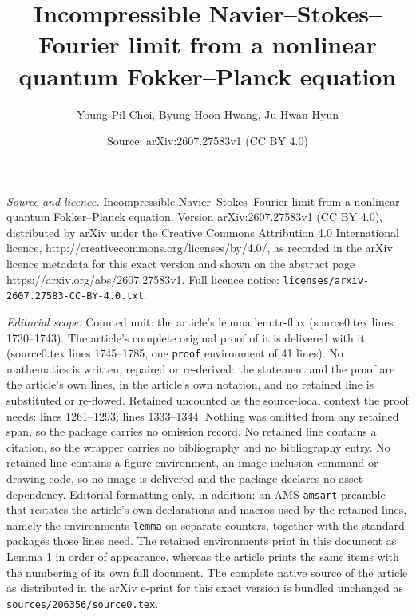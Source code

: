 \documentclass[10pt,a4paper]{amsart}
\title{Incompressible Navier--Stokes--Fourier limit from a nonlinear quantum Fokker--Planck equation}
\author{Young-Pil Choi, Byung-Hoon Hwang, Ju-Hwan Hyun}
\date{Source: arXiv:2607.27583v1 (CC BY 4.0)}
\begin{document}
\maketitle

\noindent\emph{Source and licence.} Incompressible Navier--Stokes--Fourier limit from a nonlinear quantum Fokker--Planck equation. Version arXiv:2607.27583v1 (CC BY 4.0), distributed by arXiv under the Creative Commons Attribution 4.0 International licence, http://creativecommons.org/licenses/by/4.0/, as recorded in the arXiv licence metadata for this exact version and shown on the abstract page https://arxiv.org/abs/2607.27583v1. Full licence notice: \texttt{licenses/arxiv-2607.27583-CC-BY-4.0.txt}.\par\smallskip

\noindent\textit{Editorial scope.} Counted unit: the article's lemma lem:tr-flux (source0.tex lines 1730--1743). The article's complete original proof of it is delivered with it (source0.tex lines 1745--1785, one \texttt{proof} environment of 41 lines). No mathematics is written, repaired or re-derived: the statement and the proof are the article's own lines, in the article's own notation, and no retained line is substituted or re-flowed.  Retained uncounted as the source-local context the proof needs: lines 1261--1293; lines 1333--1344.  Nothing was omitted from any retained span, so the package carries no omission record.  No retained line contains a citation, so the wrapper carries no bibliography and no bibliography entry.  No retained line contains a figure environment, an image-inclusion command or drawing code, so no image is delivered and the package declares no asset dependency.  Editorial formatting only, in addition: an AMS \texttt{amsart} preamble that restates the article's own declarations and macros used by the retained lines, namely the environments \texttt{lemma} on separate counters, together with the standard packages those lines need.  The retained environments print in this document as Lemma 1 in order of appearance, whereas the article prints the same items with the numbering of its own full document.  The complete native source of the article as distributed in the arXiv e-print for this exact version is bundled unchanged as \texttt{sources/206356/source0.tex}.
\end{document}
